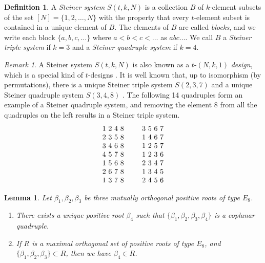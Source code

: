 \documentclass[11pt]{amsart}
\theoremstyle{plain}
\newtheorem{lemma}[theorem]{Lemma}
\theoremstyle{definition}
\newtheorem{defn}[theorem]{Definition}
\theoremstyle{remark}
\newtheorem{rmk}[theorem]{Remark}
\numberwithin{equation}{subsection}
\newcommand{\be}{\beta}
\newcommand{\coplanar}{coplanar\xspace}
\begin{document}
\begin{defn}
\label{def:steiner}
A {\it Steiner system} $S(t,k,N)$ is a collection $B$ of $k$-element subsets of
the set $[N]=\{1,2,\dots, N\}$ with the property that every $t$-element subset
is contained in a unique element of $B$. The elements of $B$ are called
\emph{blocks}, and we write each block $\{a,b,c,\dots\}$ where $a<b<c<\dots$ as
$abc\dots$. We call $B$ a \emph{Steiner triple system} if $k=3$ and a
\emph{Steiner quadruple system} if $k=4$.
\end{defn}

\begin{rmk}
    \label{rmk:steiner_unique}
    A Steiner system $S(t,k,N)$ is also known as a $t$-$(N,k,1)$ \emph{design},
    which is a special kind of $t$-designs \cite[Section
    4.1]{design07}.
    It is well known that, up to isomorphism (by permutations), there is a
    unique Steiner triple system $S(2,3,7)$ and a unique Steiner quadruple
    system $S(3,4,8)$ \cite{barrau1908}. The following 14 quadruples form an
    example of a Steiner quadruple system, and removing the element 8 from all
    the quadruples on the left results in a Steiner triple system.  $$
    \begin{tabular}{c  c} 1  2  4  8  \quad& \quad  3  5  6  7 \\ 2 3  5  8
          \quad &\quad  1  4  6  7 \\ 3  4  6  8  \quad& \quad  1 2  5  7 \\ 4 5
          7 8  \quad& \quad  1  2  3  6 \\ 1  5  6 8  \quad& \quad  2  3  4 7 \\
          2  6 7  8  \quad& \quad  1  3  4 5 \\ 1  3  7  8  \quad& \quad  2 4  5
          6 \\
      \end{tabular} $$
  \end{rmk}

\begin{lemma}\label{lem:e8coplanar}
Let $\be_1, \be_2, \be_3$ be three mutually orthogonal positive roots of type
$E_8$.
\begin{enumerate}
    \item[{\rm (i)}]{There exists a unique positive root $\be_4$ such that
     $\{\be_1, \be_2, \be_3, \be_4\}$ is a \coplanar quadruple.}
 \item[{\rm (ii)}]{If $R$ is a maximal orthogonal set of positive roots of type
     $E_8$, and $\{\be_1, \be_2, \be_3\} \subset R$, then we have $\be_4 \in
 R$.}
\end{enumerate}
\end{lemma}
\end{document}
